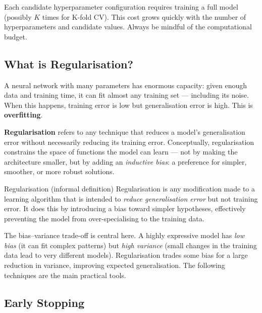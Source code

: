 \documentclass[11pt,a4paper]{article}
\newcommand{\term}[1]{\textcolor{DefGreen}{\textbf{#1}}\index{#1}}
\begin{document}
\begin{warnbox}
Each candidate hyperparameter configuration requires training a full model (possibly $K$ times for K-fold CV). This cost grows quickly with the number of hyperparameters and candidate values. Always be mindful of the computational budget.
\end{warnbox}


\subsection{What is Regularisation?}

A neural network with many parameters has enormous capacity: given enough data and training time, it can fit almost any training set — including its noise. When this happens, training error is low but generalisation error is high. This is \term{overfitting}.

\term{Regularisation} refers to any technique that reduces a model's generalisation error without necessarily reducing its training error. Conceptually, regularisation constrains the space of functions the model can learn — not by making the architecture smaller, but by adding an \emph{inductive bias}: a preference for simpler, smoother, or more robust solutions.

\begin{defbox}{Regularisation (informal definition)}
Regularisation is any modification made to a learning algorithm that is intended to \emph{reduce generalisation error} but not training error. It does this by introducing a bias toward simpler hypotheses, effectively preventing the model from over-specialising to the training data.
\end{defbox}

The bias–variance trade-off is central here. A highly expressive model has \emph{low bias} (it can fit complex patterns) but \emph{high variance} (small changes in the training data lead to very different models). Regularisation trades some bias for a large reduction in variance, improving expected generalisation. The following techniques are the main practical tools.

\subsection{Early Stopping}
\end{document}
